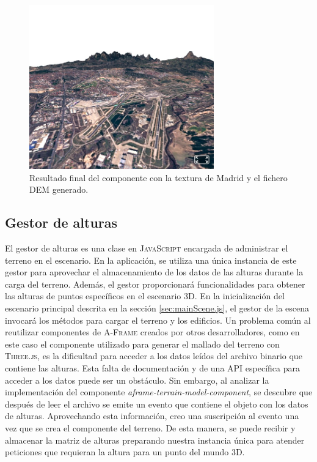 \documentclass[a4paper, 11pt]{book}
\begin{document}
\begin{figure}[h]
  \centering
  \includegraphics[width=8cm, keepaspectratio]{img/madrid_terrain.jpg}
  \caption{Resultado final del componente con la textura de Madrid y el fichero DEM generado.}
  \label{fig:demAframe}
\end{figure}

\subsection{Gestor de alturas}
\label{subsec:heightManager}
El gestor de alturas es una clase en \textsc{JavaScript} encargada de administrar el terreno en el escenario. En la aplicación, se utiliza una única instancia de este gestor para aprovechar el almacenamiento de los datos de las alturas durante la carga del terreno. Además, el gestor proporcionará funcionalidades para obtener las alturas de puntos específicos en el escenario \textsc{3D}. En la inicialización del escenario principal descrita en la sección \ref{sec:mainScene.js}, el gestor de la escena invocará los métodos para cargar el terreno y los edificios.
Un problema común al reutilizar componentes de \textsc{A-Frame} creados por otros desarrolladores, como en este caso el componente utilizado para generar el mallado del terreno con \textsc{Three.js}, es la dificultad para acceder a los datos leídos del archivo binario que contiene las alturas. Esta falta de documentación y de una \gls{API} específica para acceder a los datos puede ser un obstáculo.
Sin embargo, al analizar la implementación del componente \emph{aframe-terrain-model-component}, se descubre que después de leer el archivo se emite un evento que contiene el objeto con los datos de alturas.
Aprovechando esta información, creo una suscripción al evento una vez que se crea el componente del terreno. De esta manera, se puede recibir y almacenar la matriz de alturas preparando nuestra instancia única para atender peticiones que requieran la altura para un punto del mundo 3D.
\end{document}
